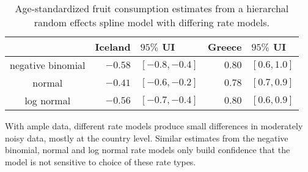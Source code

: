     \begin{table}[h]
        \begin{center}
        \begin{tabular}{|c|rl|rl|}
            \hline
                & Iceland&$95\%$ UI & Greece&$95\%$ UI \\
            \hline
                negative binomial & $-0.58$&$ [-0.8, -0.4]$ & $0.80$&$ [0.6, 1.0]$ \\
                normal & $-0.41$&$ [-0.6, -0.2]$ & $0.78$&$ [0.7, 0.9]$ \\
                log normal & $-0.56$& $[-0.7, -0.4]$ & $0.80$&$ [0.6, 0.9]$ \\
            \hline
        \end{tabular}
        \end{center}
        \caption{ Age-standardized fruit consumption estimates
          from a hierarchal random effects spline model with differing
          rate models.}
        \label{tab:app-fruit rfx}
    \end{table}

With ample data, different rate models produce small differences in
moderately noisy data, mostly at the country level.  Similar estimates
from the negative binomial, normal and log normal rate models only
build confidence that the model is not sensitive to choice of these
rate types.
